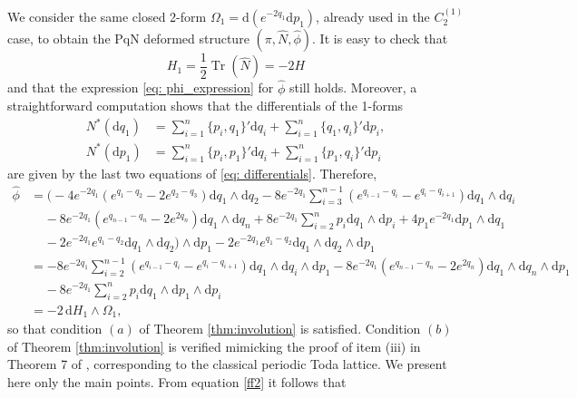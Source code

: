 \documentclass[12pt]{article}
\def\d{{\mathrm d}}
\def\Tr{\operatorname{Tr}}
\begin{document}
We consider the same closed 2-form $\Omega_1=\d(e^{-2q_1}\d p_1)$, already used in the $C_{2}^{(1)}$ case, to 
obtain the PqN deformed structure $(\pi,\widehat{N},\widehat{\phi})$. It is easy to check that 
\begin{equation}
H_1=\frac{1}{2}\Tr(\widehat{N})=-2H
\end{equation}
and that the expression \eqref{eq: phi_expression} for $\widehat{\phi}$ still holds. 
Moreover, a straightforward computation shows that the differentials of the 1-forms
\begin{align*}
    N^{*}\left(\d q_1\right)&=\sum_{i=1}^{n}\lbrace p_i,q_1\rbrace' \d q_i+\sum_{i=1}^n\lbrace q_1,q_i\rbrace' \d p_i,\\%
    N^{*}\left(\d p_1\right)&=\sum_{i=1}^{n}\lbrace p_i,p_1\rbrace' \d q_i+\sum_{i=1}^n\lbrace p_1,q_i\rbrace' \d p_i%
\end{align*}
are given by the last two equations of \eqref{eq: differentials}. Therefore,
\begin{align*}
    \widehat{\phi}
    &=\Big(-4e^{-2q_1}\left(e^{q_1-q_2}-2e^{q_2-q_3}\right)\d q_1\wedge \d q_2-8e^{-2q_1}\sum_{i=3}^{n-1}\left(e^{q_{i-1}-q_i}-e^{q_i-q_{i+1}}\right)\d q_1\wedge \d q_i\\
    &\;\;\;\;-8e^{-2q_1}\left(e^{q_{n-1}-q_n}-2e^{2q_n}\right)\d q_1\wedge \d q_n+8e^{-2q_1}\sum_{i=2}^np_i\d q_1\wedge \d p_i+4p_1e^{-2q_1}\d p_1\wedge \d q_1\\
    &\;\;\;\;-2e^{-2q_1}e^{q_1-q_2}\d q_1\wedge \d q_2\Big)\wedge \d p_1
    -2e^{-2q_1}e^{q_1-q_2}\d q_1\wedge \d q_2\wedge \d p_1\\
    &=-8e^{-2q_1}\sum_{i=2}^{n-1}\left(e^{q_{i-1}-q_i}-e^{q_i-q_{i+1}}\right)\d q_1\wedge \d q_i\wedge \d p_1-8e^{-2q_1}\left(e^{q_{n-1}-q_n}-2e^{2q_n}\right)\d q_1\wedge \d q_n\wedge \d p_1\\
    &\;\;\;\;-8e^{-2q_1}\sum_{i=2}^np_i\d q_1\wedge \d p_1\wedge \d p_i\\
    &=-2\,\d H_1\wedge\Omega_1,
\end{align*}
so that condition $(a)$ of Theorem \ref{thm:involution} is satisfied. Condition $(b)$ of Theorem \ref{thm:involution} is verified mimicking the proof of item (iii) in Theorem 7 of \cite{FMOP2020}, corresponding to the classical periodic Toda lattice. We present here only the main points. From equation \eqref{ff2} it follows that 
\end{document}
